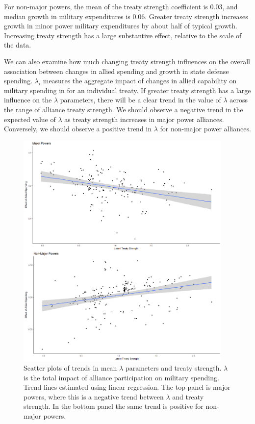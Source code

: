 \documentclass[12pt]{article}
\begin{document}
For non-major powers, the mean of the treaty strength coefficient is 0.03, and median growth in military expenditures is 0.06. 
Greater treaty strength increases growth in minor power military expenditures by about half of typical growth. 
Increasing treaty strength has a large substantive effect, relative to the scale of the data. 


We can also examine how much changing treaty strength influences on the overall association between changes in allied spending and growth in state defense spending. 
$\lambda_i$ measures the aggregate impact of changes in allied capability on military spending in for an individual treaty. 
If greater treaty strength has a large influence on the $\lambda$ parameters, there will be a clear trend in the value of $\lambda$ across the range of alliance treaty strength.
We should observe a negative trend in the expected value of $\lambda$ as treaty strength increases in major power alliances. 
Conversely, we should observe a positive trend in $\lambda$ for non-major power alliances. 


\begin{figure}[htbp]
	\centering
		\includegraphics[width=0.95\textwidth]{../figures/lambda-ls-scatter.png}
	\caption{Scatter plots of trends in mean $\lambda$ parameters and treaty strength. $\lambda$ is the total impact of alliance participation on military spending. Trend lines estimated using linear regression. The top panel is major powers, where this is a negative trend between $\lambda$ and treaty strength. In the bottom panel the same trend is positive for non-major powers.}
	\label{fig:lambda-ls-scatter}
\end{figure}
\end{document}
